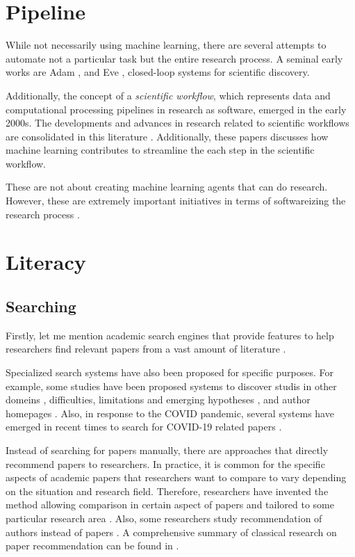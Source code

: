 \documentclass{book}
\begin{document}
\section{Pipeline}
While not necessarily using machine learning, there are several attempts to automate not a particular task but the entire research process. A seminal early works are Adam \cite{king2004functional}, and Eve \cite{williams2015cheaper}, closed-loop systems for scientific discovery. 

Additionally, the concept of a \textit{scientific workflow}, which represents data and computational processing pipelines in research as software, emerged in the early 2000s. The developments and advances in research related to scientific workflows are consolidated in this literature \cite{barker2008scientific,atkinson2017scientific}. Additionally, these papers \cite{deelman2019role,nouri2021exploring} discusses how machine learning contributes to streamline the each step in the scientific workflow.

These are not about creating machine learning agents that can do research. However, these are extremely important initiatives in terms of softwareizing the research process \cite{deelman2015pegasus,gil2011semantic}.

\section{Literacy}

\subsection{Searching}

Firstly, let me mention academic search engines that provide features to help researchers find relevant papers from a vast amount of literature \cite{googlescholar,semanticscholar,dblp,pubmed,citeseerx}. 

Specialized search systems have also been proposed for specific purposes. For example, some studies have been proposed systems to discover studis in other domeins \cite{kang2022augmenting}, difficulties, limitations and emerging hypotheses \cite{lahav2022search}, and author homepages \cite{patel2021author}. Also, in response to the COVID pandemic, several systems have emerged in recent times to search for COVID-19 related papers \cite{hope2020scisight}.

Instead of searching for papers manually, there are approaches that directly recommend papers to researchers. In practice, it is common for the specific aspects of academic papers that researchers want to compare to vary depending on the situation and research field. Therefore, researchers have invented the method allowing comparison in certain aspect of papers \cite{ostendorff2020aspect} and tailored to some particular research area \cite{breitinger2022recommending}. Also, some researchers study recommendation of authors instead of papers \cite{portenoy2022bursting}. A comprehensive summary of classical research on paper recommendation can be found in \cite{bai2019scientific}.
\end{document}
